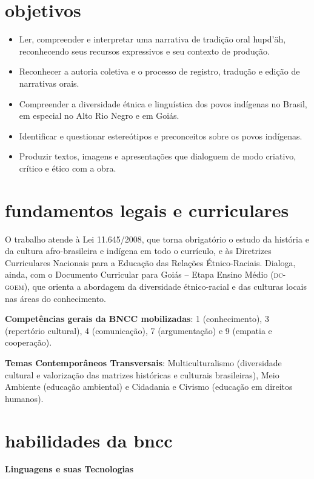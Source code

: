 \section{objetivos}

\begin{itemize}
\item Ler, compreender e interpretar uma narrativa de tradição oral
hupd'äh, reconhecendo seus recursos expressivos e seu contexto de
produção.
\item Reconhecer a autoria coletiva e o processo de registro, tradução e
edição de narrativas orais.
\item Compreender a diversidade étnica e linguística dos povos indígenas
no Brasil, em especial no Alto Rio Negro e em Goiás.
\item Identificar e questionar estereótipos e preconceitos sobre os
povos indígenas.
\item Produzir textos, imagens e apresentações que dialoguem de modo
criativo, crítico e ético com a obra.
\end{itemize}

\section{fundamentos legais e curriculares}

O trabalho atende à Lei 11.645/2008, que torna obrigatório o estudo da
história e da cultura afro-brasileira e indígena em todo o currículo, e
às Diretrizes Curriculares Nacionais para a Educação das Relações
Étnico-Raciais. Dialoga, ainda, com o Documento Curricular para Goiás --
Etapa Ensino Médio (\textsc{dc-goem}), que orienta a abordagem da diversidade
étnico-racial e das culturas locais nas áreas do conhecimento.

\textbf{Competências gerais da BNCC mobilizadas}: 1
(conhecimento), 3 (repertório cultural), 4 (comunicação), 7
(argumentação) e 9 (empatia e cooperação).

\textbf{Temas Contemporâneos Transversais}: Multiculturalismo
(diversidade cultural e valorização das matrizes históricas e culturais
brasileiras), Meio Ambiente (educação ambiental) e Cidadania e Civismo
(educação em direitos humanos).

\section{habilidades da bncc}

\textbf{Linguagens e suas Tecnologias}

